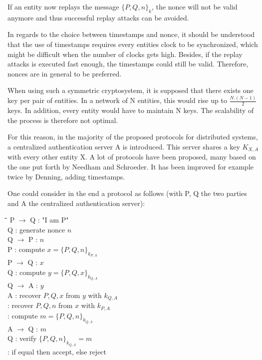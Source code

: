 If an entity now replays the message $\lbrace P, Q, n \rbrace_{k}$, the nonce will not be valid anymore and thus successful replay attacks can be avoided.

In regards to the choice between timestamps and nonce, it should be understood that the use of timestamps requires every entities clock to be synchronized, which might be difficult when the number of clocks gets high. Besides, if the replay attacks is executed fast enough, the timestamps could still be valid. Therefore, nonces are in general to be preferred.
\label{02_timestamp_vs_nonce}

When using such a symmetric cryptosystem, it is supposed that there exists one key per pair of entities. In a network of N entities, this would rise up to $\frac{N.(N-1)}{2}$ keys. In addition, every entity would have to maintain N keys. The scalability of the process is therefore not optimal. 

For this reason, in the majority of the proposed protocols for distributed systems, a centralized authentication server A is introduced. This server shares a key $K_{X,A}$ with every other entity X. A lot of protocols have been proposed, many based on the one put forth by Needham and Schroeder\cite{needham1978using}. It has been improved for example twice by Denning\cite{denning1981timestamps}\cite{robling1982cryptography}, adding timestamps. 

One could consider in the end a protocol as follows (with P, Q the two parties and A the centralized authentication server):

\begin{tabbing}
	\hspace{4em}\=\hspace{4em}\=\hspace{2em}\=\kill
	\>  P $\rightarrow$ Q \>  : \> "I am P" \\
	\>  Q  \>  : \> generate nonce $n$ \\
	\>  Q $\rightarrow$ P \>  : \> $n$ \\
	\>  P  \>  : \> compute $x = \lbrace P, Q, n \rbrace_{k_{P,A}}$ 				\\
	\>  P $\rightarrow$ Q \>  : \> $x$ \\
	\>  Q  \>  : \> compute $y = \lbrace P, Q, x \rbrace_{k_{Q,A}}$ 				\\
	\>  Q $\rightarrow$ A \>  : \> $y$ \\
	\>  A  \>  : \> recover $P,Q,x$ from $y$ with $k_{Q,A}$ \\
	\>    \>  : \> recover $P,Q,n$ from $x$ with $k_{P,A}$ \\
	\>    \>  : \> compute $m = \lbrace P,Q,n \rbrace_{k_{Q,A}}$ \\
	\>  A $\rightarrow$ Q \>  : \> $m$ \\
	\>  Q \>  : \> verify $\lbrace P, Q, n \rbrace_{k_{Q,A}} = m$ \\
	\>    \>  : \> if equal then accept, else reject \\
\end{tabbing} 


